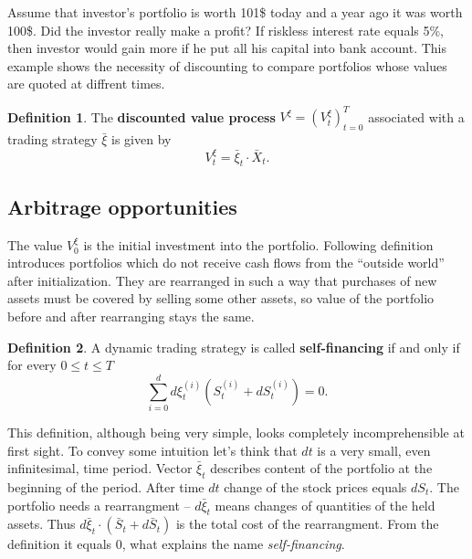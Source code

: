 \documentclass[a4paper,11pt, twoside]{book}
\theoremstyle{definition}
\newtheorem{mydef}{Definition}[chapter]
\theoremstyle{remark}
\def\Sa{\bar{S}}
\def\Xa{\bar{X}}
\def\xia{\bar{\xi}}
\begin{document}
Assume that investor's portfolio is worth 101\$ today and a year ago it was worth 100\$. Did the investor really make a profit? If riskless interest rate equals 5\%, then investor would gain more if he put all his capital into bank account. This example shows the necessity of discounting to compare portfolios whose values are quoted at diffrent times.
\begin{mydef}
 The \textbf{discounted value process} $V^{\xi} = (V^{\xi}_t)_{t=0}^T$ associated with a trading strategy $\xia$ is given by 
 \begin{equation*}
  V^{\xi}_t = \xia_t \cdot \Xa_t.
 \end{equation*}
\end{mydef}

\subsection{Arbitrage opportunities}
The value $V^{\xi}_0$ is the initial investment into the portfolio. Following definition introduces portfolios which do not receive cash flows from the ``outside world'' after initialization. They are rearranged in such a way that purchases of new assets must be covered by selling some other assets, so value of the portfolio before and after rearranging stays the same.
\begin{mydef}
 A dynamic trading strategy is called \textbf{self-financing} if and only if for every $0 \leq t \leq T$
 \[ \sum\limits_{i=0}^d d\xi^{(i)}_t (S^{(i)}_t + dS^{(i)}_t) = 0. \]
\end{mydef}
This definition, although being very simple, looks completely incomprehensible at first sight. To convey some intuition let's think that $dt$ is a very small, even infinitesimal, time period. Vector $\xia_t$ describes content of the portfolio at the beginning of the period. After time $dt$ change of the stock prices equals $dS_t$. The portfolio needs a rearrangment -- $d\xia_t$ means changes of quantities of the held assets.
Thus $d\xia_t \cdot (\Sa_t + d\Sa_t)$ is the total cost of the rearrangment. From the definition it equals 0, what explains the name \textit{self-financing}.
\end{document}
